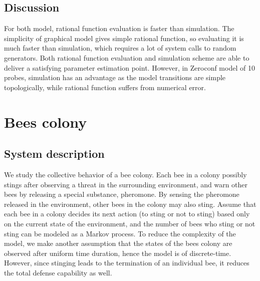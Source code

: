 \subsection{Discussion}
For both model, rational function evaluation is faster than simulation. The simplicity of graphical
model gives simple rational function, so evaluating it is much faster than simulation, which
requires a lot of system calls to random generators. Both rational function evaluation and
simulation scheme are able to deliver a satisfying parameter estimation point. However, in Zeroconf
model of 10 probes, simulation has an advantage as the model transitions are simple topologically,
while rational function suffers from numerical error.

\section{Bees colony}
\subsection{System description}
We study the collective behavior of a bee colony. Each bee in a colony possibly stings after
observing a threat in the surrounding environment, and warn other bees by releasing a special
substance, pheromone. By sensing the pheromone released in the environment, other bees in the colony
may also sting. Assume that each bee in a colony decides its next action (to sting or not to sting)
based only on the current state of the environment, and the number of bees who sting or not sting
can be modeled as a Markov process. To reduce the complexity of the model, we make another
assumption that the states of the bees colony are observed after uniform time duration, hence the
model is of discrete-time. However, since stinging leads to the termination of an individual bee, it
reduces the total defense capability as well.

